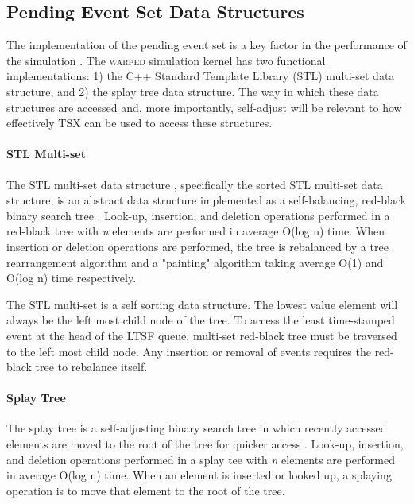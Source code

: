 \documentclass[11pt]{book}
\begin{document}
\subsection{Pending Event Set Data Structures}

The implementation of the pending event set is a key factor in the performance
of the simulation \cite{twpes}.  The \textsc{warped} simulation kernel has two
functional implementations: 1) the C++ Standard Template Library (STL) multi-set
data structure, and 2) the splay tree data structure.  The way in which these
data structures are accessed and, more importantly, self-adjust will be relevant
to how effectively TSX can be used to access these structures.

\paragraph{STL Multi-set}

The STL multi-set data structure , specifically the sorted STL multi-set data
structure, is an abstract data structure implemented as a self-balancing,
red-black binary search tree \cite{redblack}.  Look-up, insertion, and
deletion operations performed in a red-black tree with \emph{n} elements are
performed in average O(log n) time.  When insertion or deletion operations are
performed, the tree is rebalanced by a tree rearrangement algorithm and a
"painting" algorithm taking average O(1) and O(log n) time respectively. 

The STL multi-set is a self sorting data structure.  The lowest value element
will always be the left most child node of the tree.  To access the least
time-stamped event at the head of the LTSF queue, multi-set red-black tree must
be traversed to the left most child node.  Any insertion or removal of events
requires the red-black tree to rebalance itself.  

\paragraph{Splay Tree}

The splay tree is a self-adjusting binary search tree in which recently accessed
elements are moved to the root of the tree for quicker access \cite{splaytree}.
Look-up, insertion, and deletion operations performed in a splay tee with
\emph{n} elements are performed in average O(log n) time.  When an element is
inserted or looked up, a splaying operation is to move that element to the root
of the tree.
\end{document}
